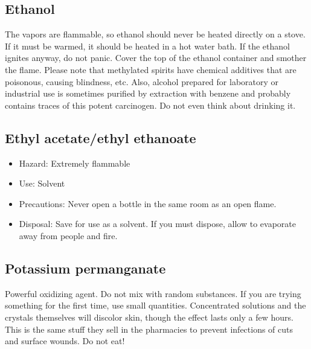 \subsection{Ethanol}
The vapors are flammable, 
so ethanol should never be heated directly on a stove. 
If it must be warmed, it should be heated in a hot water bath. 
If the ethanol ignites anyway, do not panic. 
Cover the top of the ethanol container and smother the flame. 
Please note that methylated spirits have chemical additives that are poisonous, 
causing blindness, etc. 
Also, alcohol prepared for laboratory or industrial use 
is sometimes purified by extraction with benzene 
and probably contains traces of this potent carcinogen. 
Do not even think about drinking it.

\subsection{Ethyl acetate/ethyl ethanoate}

\begin{itemize}

\item{Hazard: Extremely flammable}

\item{Use: Solvent}

\item{Precautions: Never open a bottle in the same room as an open flame.}

\item{Disposal: Save for use as a solvent. 
If you must dispose, allow to evaporate away from people and fire.}

\end{itemize}

\subsection{Potassium permanganate}
Powerful oxidizing agent. 
Do not mix with random substances. 
If you are trying something for the first time, use small quantities. 
Concentrated solutions and the crystals themselves will discolor skin, 
though the effect lasts only a few hours. 
This is the same stuff they sell in the pharmacies 
to prevent infections of cuts and surface wounds. 
Do not eat!

